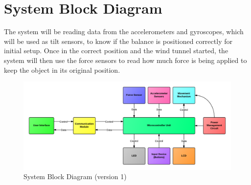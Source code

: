 \section{System Block Diagram}


	The system will be reading data from the accelerometers and gyroscopes, which will be used as tilt sensors, to know if the balance is positioned correctly for initial setup. Once in the correct position and the wind tunnel started, the system will then use the force sensors to read how much force is being applied to keep the object in its original position. 

	\begin{figure}[H]
		\centering
			\includegraphics[scale=0.30]{img/systembdv1}
		\caption{System Block Diagram (version 1)}
	\end{figure}